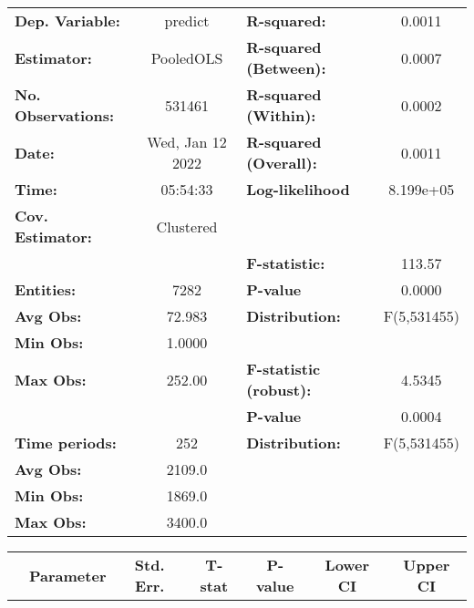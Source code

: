 \begin{center}
\begin{tabular}{lclc}
\toprule
\textbf{Dep. Variable:}    &      predict       & \textbf{  R-squared:         }   &      0.0011      \\
\textbf{Estimator:}        &     PooledOLS      & \textbf{  R-squared (Between):}  &      0.0007      \\
\textbf{No. Observations:} &       531461       & \textbf{  R-squared (Within):}   &      0.0002      \\
\textbf{Date:}             &  Wed, Jan 12 2022  & \textbf{  R-squared (Overall):}  &      0.0011      \\
\textbf{Time:}             &      05:54:33      & \textbf{  Log-likelihood     }   &    8.199e+05     \\
\textbf{Cov. Estimator:}   &     Clustered      & \textbf{                     }   &                  \\
\textbf{}                  &                    & \textbf{  F-statistic:       }   &      113.57      \\
\textbf{Entities:}         &        7282        & \textbf{  P-value            }   &      0.0000      \\
\textbf{Avg Obs:}          &       72.983       & \textbf{  Distribution:      }   &   F(5,531455)    \\
\textbf{Min Obs:}          &       1.0000       & \textbf{                     }   &                  \\
\textbf{Max Obs:}          &       252.00       & \textbf{  F-statistic (robust):} &      4.5345      \\
\textbf{}                  &                    & \textbf{  P-value            }   &      0.0004      \\
\textbf{Time periods:}     &        252         & \textbf{  Distribution:      }   &   F(5,531455)    \\
\textbf{Avg Obs:}          &       2109.0       & \textbf{                     }   &                  \\
\textbf{Min Obs:}          &       1869.0       & \textbf{                     }   &                  \\
\textbf{Max Obs:}          &       3400.0       & \textbf{                     }   &                  \\
\bottomrule
\end{tabular}
\begin{tabular}{lcccccc}
                & \textbf{Parameter} & \textbf{Std. Err.} & \textbf{T-stat} & \textbf{P-value} & \textbf{Lower CI} & \textbf{Upper CI}  \\

\end{tabular}
\end{center}
